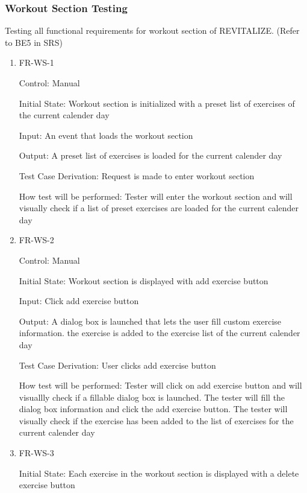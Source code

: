 \documentclass[12pt, titlepage]{article}
\begin{document}
\subsubsection{Workout Section Testing}

Testing all functional requirements for workout section of REVITALIZE. (Refer to BE5 in SRS)

\begin{enumerate}
	
	\item{FR-WS-1\\}
	
	Control: Manual
	
	Initial State: Workout section is initialized with a preset list of exercises of the current calender day
	
	Input: An event that loads the workout section
	
	Output: A preset list of exercises is loaded for the current calender day
	
	Test Case Derivation: Request is made to enter workout section
	
	How test will be performed: Tester will enter the workout section and will visually check if a list of preset exercises are loaded for the current calender day
	
	\item{FR-WS-2 \\}
	
	Control: Manual
	
	Initial State: Workout section is displayed with add exercise button
	
	Input: Click add exercise button
	
	Output: A dialog box is launched that lets the user fill custom exercise information. the exercise is added to the exercise list of the current calender day
	
	Test Case Derivation: User clicks add exercise button
	
	How test will be performed: Tester will click on add exercise button and will visuallly check if a fillable dialog box is launched. The tester will fill the dialog box information and click the add exercise button. The tester will visually check if the exercise has been added to the list of exercises for the current calender day
	
	\item{FR-WS-3\\}
	
	Initial State: Each exercise in the workout section is displayed with a delete exercise button
	

\end{enumerate}
\end{document}
